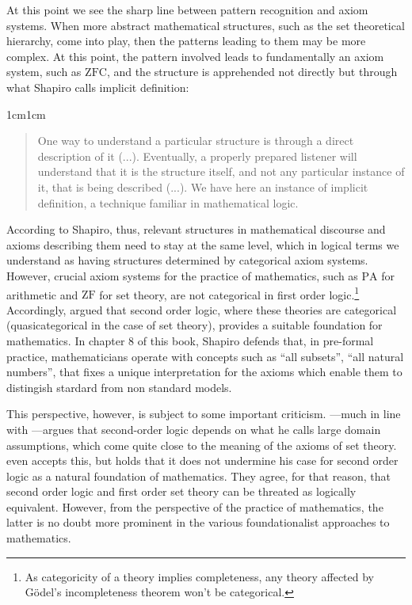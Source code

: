 \documentclass[11pt,a4paper]{article}
\begin{document}
At this point we see the sharp line between pattern recognition and axiom systems. When more abstract mathematical structures, such as the set theoretical hierarchy, come into play, then the patterns leading to them may be more complex. At this point, the pattern involved leads to fundamentally an axiom system, such as $\mathrm{ZFC}$, and the structure is apprehended not directly but through what Shapiro calls implicit definition:

\begin{adjustwidth}{1cm}{1cm}
\begin{quote}
  \small
One way to understand a particular structure is through a direct description of it (...). Eventually, a properly prepared listener will understand that it is the structure itself, and not any particular instance of it, that is being described (...). We have here an instance of implicit definition, a technique familiar in mathematical logic. \parencite[p. 130]{Shapiro1997}
\end{quote}
\end{adjustwidth}

According to Shapiro, thus, relevant structures in mathematical discourse and axioms describing them need to stay at the same level, which in logical terms we understand as having structures determined by categorical axiom systems. However, crucial axiom systems for the practice of mathematics, such as $\mathrm{PA}$ for arithmetic and $\mathrm{ZF}$ for set theory, are not categorical in first order logic.\footnote{As categoricity of a theory implies completeness, any theory affected by Gödel's incompleteness theorem won't be categorical.} Accordingly, \textcite{shapiro1991foundations} argued that second order logic, where these theories are categorical (quasicategorical in the case of set theory), provides a suitable foundation for mathematics. In chapter 8 of this book, Shapiro defends that, in pre-formal practice, mathematicians operate with concepts such as ``all subsets'', ``all natural numbers'', that fixes a unique interpretation for the axioms which enable them to distingish stardard from non standard models.

This perspective, however, is subject to some important criticism. \textcite{Vaananen2015}---much in line with \textcite{Quine1941}---argues that second-order logic depends on what he calls large domain assumptions, which come quite close to the meaning of the axioms of set theory. \textcite{Shapiro2012} even accepts this, but holds that it does not undermine his case for second order logic as a natural foundation of mathematics. They agree, for that reason, that second order logic and first order set theory can be threated as logically equivalent. However, from the perspective of the practice of mathematics, the latter is no doubt more prominent in the various foundationalist approaches to mathematics. 
\end{document}
